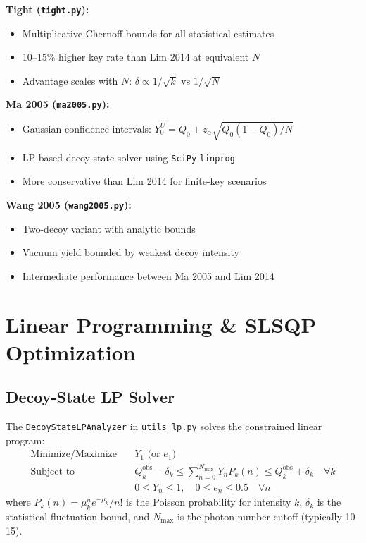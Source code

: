 \documentclass[11pt,a4paper,oneside]{report}
\begin{document}
\textbf{Tight (\texttt{tight.py}):}
\begin{itemize}
\item Multiplicative Chernoff bounds for all statistical estimates
\item 10–15\% higher key rate than Lim 2014 at equivalent $N$
\item Advantage scales with $N$: $\delta \propto 1/\sqrt{k}$ vs $1/\sqrt{N}$
\end{itemize}

\textbf{Ma 2005 (\texttt{ma2005.py}):}
\begin{itemize}
\item Gaussian confidence intervals: $Y_0^U = Q_0 + z_\alpha\sqrt{Q_0(1-Q_0)/N}$
\item LP-based decoy-state solver using \texttt{SciPy} \texttt{linprog}
\item More conservative than Lim 2014 for finite-key scenarios
\end{itemize}

\textbf{Wang 2005 (\texttt{wang2005.py}):}
\begin{itemize}
\item Two-decoy variant with analytic bounds
\item Vacuum yield bounded by weakest decoy intensity
\item Intermediate performance between Ma 2005 and Lim 2014
\end{itemize}

\section{Linear Programming \& SLSQP Optimization}

\subsection{Decoy-State LP Solver}

The \texttt{DecoyStateLPAnalyzer} in \texttt{utils\_lp.py} solves the constrained linear program:
\begin{align}
\text{Minimize/Maximize} &\quad Y_1 \text{ (or } e_1\text{)} \\
\text{Subject to} &\quad Q_k^{\text{obs}} - \delta_k \leq \sum_{n=0}^{N_{\text{max}}} Y_n P_k(n) \leq Q_k^{\text{obs}} + \delta_k \quad \forall k \\
& \quad 0 \leq Y_n \leq 1, \quad 0 \leq e_n \leq 0.5 \quad \forall n
\end{align}
where $P_k(n) = \mu_k^n e^{-\mu_k}/n!$ is the Poisson probability for intensity $k$, $\delta_k$ is the statistical fluctuation bound, and $N_{\text{max}}$ is the photon-number cutoff (typically 10–15).
\end{document}
